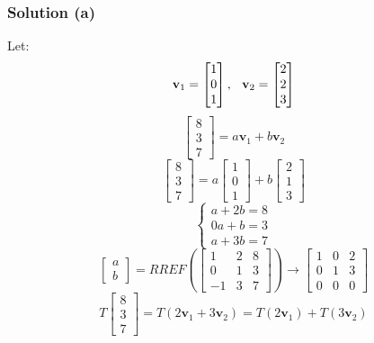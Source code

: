 \documentclass[12pt]{article}
\begin{document}
\subsubsection*{Solution (a)}
Let:
\[
  \textbf{v}_1 = \begin{bmatrix}
    1\\ 
    0\\ 
    1 
  \end{bmatrix}, \hspace{0.1in} \textbf{v}_2 = \begin{bmatrix}
  2\\ 
  2\\ 
  3 
\end{bmatrix}
\]
\[
  \begin{bmatrix}
    8\\ 
    3\\ 
    7 
  \end{bmatrix} = a\textbf{v}_1 + b\textbf{v}_2 
\]
\[
  \begin{bmatrix}
    8\\ 
    3\\ 
    7 
  \end{bmatrix} = a\begin{bmatrix}
  1\\ 
  0\\ 
  1 
  \end{bmatrix} + b\begin{bmatrix}
  2\\ 
  1\\ 
  3 
  \end{bmatrix}
\]
\[
  \begin{cases}
    a + 2b = 8\\ 
    0a + b = 3\\ 
    a + 3b = 7 
  \end{cases}
\]
\[
  \begin{bmatrix}
    a\\ 
    b 
  \end{bmatrix} = RREF\left(\begin{bmatrix}
    1 & 2 & 8\\ 
    0 & 1 & 3\\ 
    -1 & 3 & 7 
  \end{bmatrix}\right)\longrightarrow\begin{bmatrix}
    1 & 0 & 2\\ 
    0 & 1 & 3\\ 
    0 & 0 & 0 
  \end{bmatrix}
\]
\[
  T\begin{bmatrix}
      8\\ 
      3\\ 
      7 
    \end{bmatrix} = T(2\textbf{v}_1 + 3\textbf{v}_2) = T(2\textbf{v}_1) + T(3\textbf{v}_2)
\]
\end{document}
